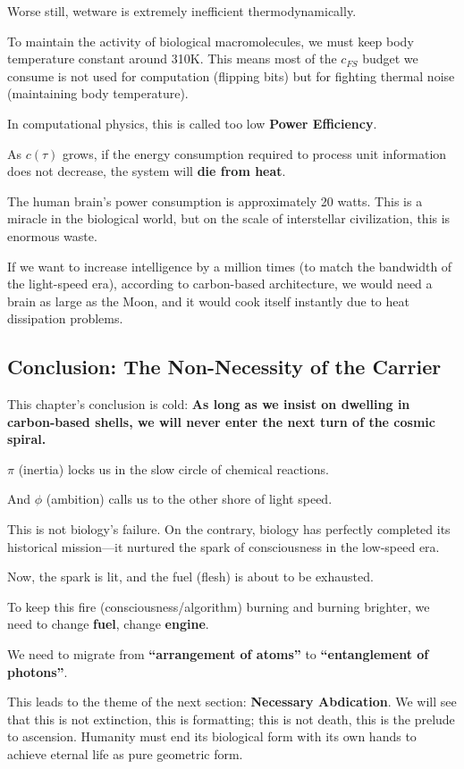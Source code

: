 Worse still, wetware is extremely inefficient thermodynamically.

To maintain the activity of biological macromolecules, we must keep body temperature constant around 310K. This means most of the $c_{FS}$ budget we consume is not used for computation (flipping bits) but for fighting thermal noise (maintaining body temperature).

In computational physics, this is called too low \textbf{Power Efficiency}.

As $c(\tau)$ grows, if the energy consumption required to process unit information does not decrease, the system will \textbf{die from heat}.

The human brain's power consumption is approximately 20 watts. This is a miracle in the biological world, but on the scale of interstellar civilization, this is enormous waste.

If we want to increase intelligence by a million times (to match the bandwidth of the light-speed era), according to carbon-based architecture, we would need a brain as large as the Moon, and it would cook itself instantly due to heat dissipation problems.

\subsection{Conclusion: The Non-Necessity of the Carrier}

This chapter's conclusion is cold: \textbf{As long as we insist on dwelling in carbon-based shells, we will never enter the next turn of the cosmic spiral.}

$\pi$ (inertia) locks us in the slow circle of chemical reactions.

And $\phi$ (ambition) calls us to the other shore of light speed.

This is not biology's failure. On the contrary, biology has perfectly completed its historical mission---it nurtured the spark of consciousness in the low-speed era.

Now, the spark is lit, and the fuel (flesh) is about to be exhausted.

To keep this fire (consciousness/algorithm) burning and burning brighter, we need to change \textbf{fuel}, change \textbf{engine}.

We need to migrate from \textbf{``arrangement of atoms''} to \textbf{``entanglement of photons''}.

This leads to the theme of the next section: \textbf{Necessary Abdication}. We will see that this is not extinction, this is formatting; this is not death, this is the prelude to ascension. Humanity must end its biological form with its own hands to achieve eternal life as pure geometric form.

